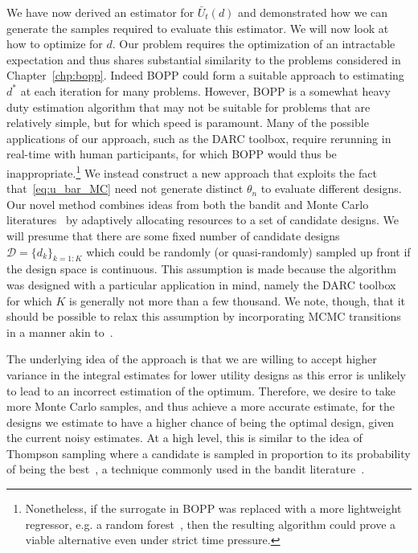 We have now derived an estimator for $\bar{U}_t(d)$ and demonstrated how we can generate the
samples required to evaluate this estimator.  We will now look at how to optimize for $d$.  
Our problem requires the optimization of an intractable expectation and thus shares substantial
similarity to the problems considered in Chapter~\ref{chp:bopp}.  Indeed BOPP could form a suitable
approach to estimating $d^*$ at each iteration for many problems.  However, BOPP is a somewhat heavy
duty estimation algorithm that may not be suitable for problems that are relatively simple,
but for which speed is paramount.  Many of the possible applications of our approach, such
as the DARC toolbox, require rerunning in real-time with human participants, for which BOPP would
thus be inappropriate.\footnote{Nonetheless, if the surrogate in BOPP
	was replaced with a more lightweight regressor, e.g. a random forest~\citep{hutter2011sequential},
	then the resulting algorithm could prove a viable alternative even under strict time pressure.}
We instead construct a new approach
that exploits the fact that~\eqref{eq:u_bar_MC} need not generate distinct $\theta_n$ to evaluate
different designs.  Our novel method combines ideas from both the bandit and
Monte Carlo literatures~\citep{amzal2006bayesian,neufeld2014adaptive} by adaptively 
allocating resources to a set of candidate designs.  We will presume that there are some fixed number 
of candidate designs $\mathcal{D} = \{d_k\}_{k=1:K}$ which could be randomly (or quasi-randomly)
sampled up front if the design space is continuous.  This assumption is made because the 
algorithm was designed with a particular application in mind, namely the DARC toolbox for which $K$
is generally not more than a few thousand.  We note, though, that it should be possible to relax this
assumption by incorporating MCMC transitions in a manner akin to~\citep{amzal2006bayesian}.

The underlying idea of the approach is that we are willing to accept higher variance in the integral estimates for lower utility designs as this error is unlikely to lead to an incorrect estimation of the optimum.
Therefore, we desire to take more Monte Carlo samples, and thus achieve a more accurate estimate, for the designs we estimate to have a higher chance of being the optimal design, given the current noisy estimates.
At a high level, this is similar  to the idea of Thompson sampling
where a candidate is sampled in proportion to its probability of being the best~\citep{thompson1933likelihood}, 
a technique commonly used in the bandit literature~\citep{agrawal2012analysis}.


